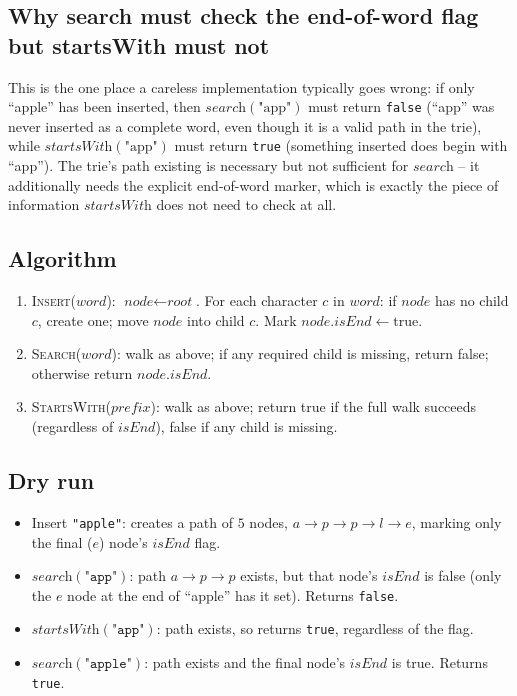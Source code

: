 \subsection*{Why search must check the end-of-word flag but startsWith must not}

This is the one place a careless implementation typically goes wrong: if
only ``apple'' has been inserted, then $\textit{search}(\text{"app"})$
must return \texttt{false} (``app'' was never inserted as a complete
word, even though it is a valid path in the trie), while
$\textit{startsWith}(\text{"app"})$ must return \texttt{true} (something
inserted does begin with ``app''). The trie's path existing is necessary
but not sufficient for $\textit{search}$ -- it additionally needs the
explicit end-of-word marker, which is exactly the piece of information
$\textit{startsWith}$ does not need to check at all.

\subsection*{Algorithm}

\begin{enumerate}
  \item \textsc{Insert}($word$): $\textit{node} \gets \textit{root}$.
        For each character $c$ in $word$: if $\textit{node}$ has no
        child $c$, create one; move $\textit{node}$ into child $c$.
        Mark $\textit{node}.\textit{isEnd} \gets \text{true}$.
  \item \textsc{Search}($word$): walk as above; if any required child
        is missing, return false; otherwise return
        $\textit{node}.\textit{isEnd}$.
  \item \textsc{StartsWith}($prefix$): walk as above; return true if the
        full walk succeeds (regardless of $\textit{isEnd}$), false if any
        child is missing.
\end{enumerate}

\subsection*{Dry run}


\begin{itemize}
  \item Insert \texttt{"apple"}: creates a path of $5$ nodes,
        $a\to p\to p\to l\to e$, marking only the final ($e$) node's
        $\textit{isEnd}$ flag.
  \item $\textit{search}(\texttt{"app"})$: path $a\to p\to p$ exists,
        but that node's $\textit{isEnd}$ is false (only the $e$ node at
        the end of ``apple'' has it set). Returns \texttt{false}.
  \item $\textit{startsWith}(\texttt{"app"})$: path exists, so returns
        \texttt{true}, regardless of the flag.
  \item $\textit{search}(\texttt{"apple"})$: path exists and the final
        node's $\textit{isEnd}$ is true. Returns \texttt{true}.
\end{itemize}


